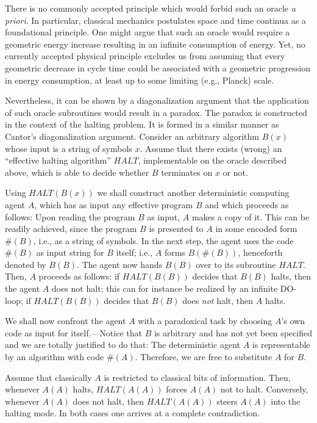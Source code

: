 There is no commonly accepted principle which would forbid
such an oracle {\it a priori}. In particular, classical mechanics
postulates space and time continua as a foundational principle. One
might argue that such an oracle would require a geometric
energy increase  resulting in an infinite consumption of energy. Yet, no
currently accepted physical principle
excludes us from assuming that every geometric
decrease
in cycle time could be associated with a geometric progression in energy
consumption, at least up to some limiting (e.g., Planck) scale.

Nevertheless,
it can be shown by a
diagonalization argument that the
application of
such oracle subroutines
would result in a paradox.
The paradox is constructed in the context of the halting problem.
It is formed in a similar manner as Cantor's diagonalization
argument.
Consider an arbitrary algorithm $B(x)$ whose input is a string of
symbols
$x$.
 Assume that there exists (wrong) an ``effective halting algorithm''
 ${ HALT}$, implementable on the oracle described above,
 which  is
 able to decide whether $B$ terminates on $x$ or not.

 Using  ${ HALT}(B(x))$ we shall construct another
 deterministic computing agent
$A$, which
 has as input any effective program $B$ and which proceeds as follows:
 Upon reading the program $B$ as input, $A$ makes a copy of it.
 This  can be readily achieved, since
 the program $B$ is presented to $A$  in some
 encoded form $\# (B)$, i.e., as a string of symbols. In the next
 step, the agent uses the
 code $\# (B)$ as input string for $B$ itself; i.e., $A$  forms
 $B(\#(B))$, henceforth denoted by $B(B)$. The agent now hands
 $B(B)$ over to its
 subroutine ${ HALT}$.
 Then, $A$ proceeds as follows:
  if ${ HALT}(B(B))$ decides that $B(B)$
 halts, then the agent
 $A$ does not halt;
this can for instance be realized by an infinite {
 DO}-loop;
  if ${ HALT}(B(B))$ decides that $B(B)$
 does {\em not} halt, then
 $A$ halts.

 We shall now confront the agent $A$ with a paradoxical task by
 choosing $A$'s own code as input for itself.---Notice
 that $B$ is arbitrary and has not yet been specified and we are
totally justified to do that:
The deterministic agent $A$ is representable by an algorithm with code
$\# (A)$. Therefore, we are free to substitute $A$ for $B$.

Assume that classically $A$ is restricted to classical bits of
information.
Then, whenever
 $A(A)$ halts,  ${ HALT}(A(A))$  forces
 $A(A)$ not to halt.
Conversely, whenever $A(A)$ does not halt, then ${ HALT}(A(A))$
 steers $A(A)$
 into the halting mode. In both cases one arrives at a
complete contradiction.

